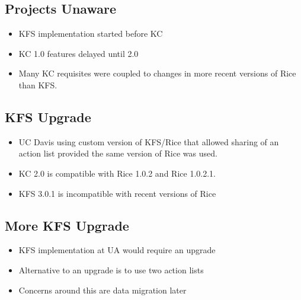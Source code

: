 \documentclass[12pt,notitlepage]{article}
\begin{document}
\begin{s5presentation}
%
%
  \W \begin{s5slide}
    \section{Projects Unaware}
    \begin{itemize}
    \item KFS implementation started before KC
    \item KC 1.0 features delayed until 2.0
    \item Many KC requisites were coupled to changes in more recent
      versions of Rice than KFS.
    \end{itemize}
  \W \end{s5slide}

%
%
  \W \begin{s5slide}
    \section{KFS Upgrade}
    \begin{itemize}
    \item UC Davis using custom version of KFS/Rice that allowed sharing of an
      action list provided the same version of Rice was used.
    \item KC 2.0 is compatible with Rice 1.0.2 and Rice 1.0.2.1.
    \item KFS 3.0.1 is incompatible with recent versions of Rice
    \end{itemize}
  \W \end{s5slide}

%
%
  \W \begin{s5slide}
    \section{More KFS Upgrade}
    \begin{itemize}
      \item KFS implementation at UA would require an upgrade
      \item Alternative to an upgrade is to use two action lists
      \item Concerns around this are data migration later
    \end{itemize}
  \W \end{s5slide}

%
%
  \W \begin{s5slide}

\end{s5slide}
\end{s5presentation}
\end{document}
